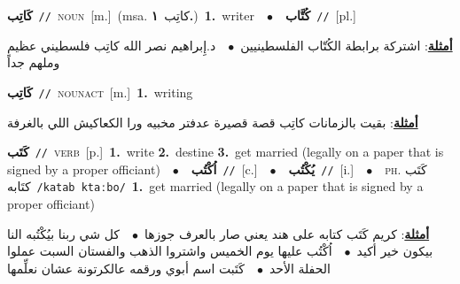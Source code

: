 \documentclass[10pt,a4paper,twoside]{article} %
\begin{document}
\begin{multicols}{2}
{\setlength\topsep{0pt}\textbf{\foreignlanguage{arabic}{كَاتِب}}\ {\color{gray}\texttt{//}\color{black}}\ \textsc{noun}\ [m.]\ \color{gray}(msa. \foreignlanguage{arabic}{كاتِب}~\foreignlanguage{arabic}{\textbf{١.}})\color{black}\ \textbf{1.}~writer\ \ $\bullet$\ \ \setlength\topsep{0pt}\textbf{\foreignlanguage{arabic}{كُتَّاب}}\ {\color{gray}\texttt{//}\color{black}}\ [pl.]\  \begin{flushright}\color{gray}\foreignlanguage{arabic}{\textbf{\underline{\foreignlanguage{arabic}{أمثلة}}}: اشتركة برابطة الكُتّاب الفلسطينيين\ $\bullet$\ \  د.إِبراهيم نصر الله كاتِب فلسطيني عظيم وملهم جداً}\end{flushright}\color{black}} \vspace{2mm}

{\setlength\topsep{0pt}\textbf{\foreignlanguage{arabic}{كَاتِب}}\ {\color{gray}\texttt{//}\color{black}}\ \textsc{noun\textunderscore act}\ [m.]\ \textbf{1.}~writing\  \begin{flushright}\color{gray}\foreignlanguage{arabic}{\textbf{\underline{\foreignlanguage{arabic}{أمثلة}}}: بقيت بالزمانات كاتِب قصة قصيرة عدفتر مخبيه ورا الكعاكيش اللي بالغرفة}\end{flushright}\color{black}} \vspace{2mm}

{\setlength\topsep{0pt}\textbf{\foreignlanguage{arabic}{كَتَب}}\ {\color{gray}\texttt{//}\color{black}}\ \textsc{verb}\ [p.]\ \textbf{1.}~write  \textbf{2.}~destine  \textbf{3.}~get married (legally on a paper that is signed by a proper officiant)\ \ $\bullet$\ \ \setlength\topsep{0pt}\textbf{\foreignlanguage{arabic}{اُكْتُب}}\ {\color{gray}\texttt{//}\color{black}}\ [c.]\ \ $\bullet$\ \ \setlength\topsep{0pt}\textbf{\foreignlanguage{arabic}{يُكْتُب}}\ {\color{gray}\texttt{//}\color{black}}\ [i.]\ \ $\bullet$\ \ \textsc{ph.} \color{gray} \foreignlanguage{arabic}{كَتَب كتَابه}\color{black}\ {\color{gray}\texttt{/{\sffamily katab ktaːbo}/}\color{black}}\ \textbf{1.}~get married (legally on a paper that is signed by a proper officiant)\  \begin{flushright}\color{gray}\foreignlanguage{arabic}{\textbf{\underline{\foreignlanguage{arabic}{أمثلة}}}: كريم كَتَب كتابه على هند يعني صار بالعرف جوزها\ $\bullet$\ \  كل شي ربنا بيُكْتُبه النا بيكون خير أكيد\ $\bullet$\ \  اُكْتُب عليها يوم الخميس واشتروا الذهب والفستان السبت عملوا الحفلة الأحد\ $\bullet$\ \  كَتَبت اسم أبوي ورقمه عالكرتونة عشان نعلِّمها}\end{flushright}\color{black}} \vspace{2mm}


\end{multicols}
\end{document}
